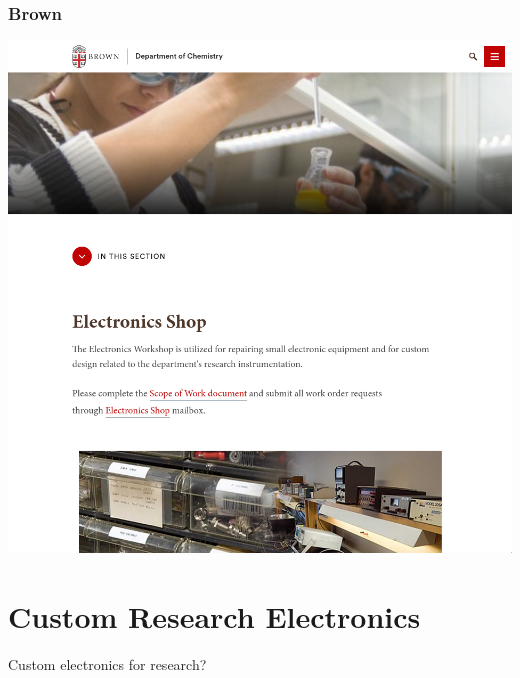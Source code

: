\documentclass{presentation}
\begin{document}
{\begin{frame}\frametitle{Brown}
  \includegraphics[width=\textwidth]{"./brown.png"}
\end{frame}

}

\section{Custom Research Electronics}

\begin{frame}
  \huge
  Custom electronics for research?
\end{frame}
\end{document}
